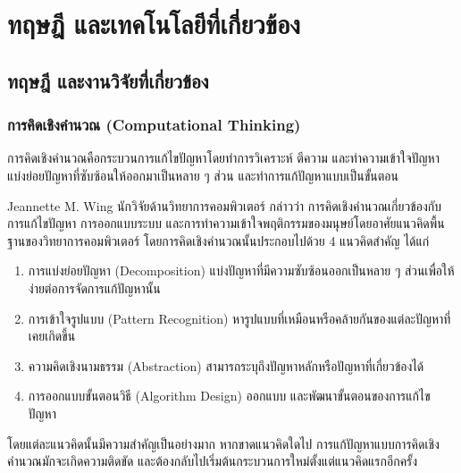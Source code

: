 \chapter{ทฤษฎี และเทคโนโลยีที่เกี่ยวข้อง}
\label{chapter:literature-review}

\section{ทฤษฎี และงานวิจัยที่เกี่ยวข้อง}
\subsection{การคิดเชิงคำนวณ (Computational Thinking)}
การคิดเชิงคำนวณคือกระบวนการแก้ไขปัญหาโดยทำการวิเคราะห์ ตีความ และทำความเข้าใจปัญหา แบ่งย่อยปัญหาที่ซับซ้อนให้ออกมาเป็นหลาย ๆ ส่วน และทำการแก้ปัญหาแบบเป็นขั้นตอน

Jeannette M. Wing นักวิจัยด้านวิทยาการคอมพิวเตอร์ กล่าวว่า การคิดเชิงคำนวณเกี่ยวข้องกับการแก้ไขปัญหา การออกแบบระบบ และการทำความเข้าใจพฤติกรรมของมนุษย์โดยอาศัยแนวคิดพื้นฐานของวิทยาการคอมพิวเตอร์ \cite{ComputationalThinking} โดยการคิดเชิงคำนวณนั้นประกอบไปด้วย 4 แนวคิดสำคัญ ได้แก่
\begin{enumerate}
    \item การแบ่งย่อยปัญหา (Decomposition) แบ่งปัญหาที่มีความซับซ้อนออกเป็นหลาย ๆ ส่วนเพื่อให้ง่ายต่อการจัดการแก้ปัญหานั้น
    \item การเข้าใจรูปแบบ (Pattern Recognition) หารูปแบบที่เหมือนหรือคล้ายกันของแต่ละปัญหาที่เคยเกิดขึ้น
    \item ความคิดเชิงนามธรรม (Abstraction) สามารถระบุถึงปัญหาหลักหรือปัญหาที่เกี่ยวข้องได้
    \item การออกแบบขั้นตอนวิธี (Algorithm Design) ออกแบบ และพัฒนาขั้นตอนของการแก้ไขปัญหา
\end{enumerate}
โดยแต่ละแนวคิดนั้นมีความสำคัญเป็นอย่างมาก หากขาดแนวคิดใดไป การแก้ปัญหาแบบการคิดเชิงคำนวณมักจะเกิดความติดขัด และต้องกลับไปเริ่มต้นกระบวนการใหม่ตั้งแต่แนวคิดแรกอีกครั้ง

